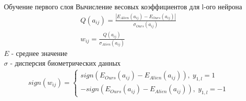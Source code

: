 \begin{frame}{Обучение первого слоя}
    Вычисление весовых коэффициентов для l-ого нейрона
    \begin{gather*}
        Q(a_{ij}) = \frac{|E_{Alien}(a_{ij}) - E_{Ours}(a_{ij})|}{\sigma_{Ours}(a_{ij})} \\
        w_{ij} = \frac{Q(a_{ij})}{\sigma_{Alien}(a_{ij})}
    \end{gather*}
    $E$ - среднее значение \\
    $\sigma$ - дисперсия биометрических данных
    \begin{gather*}
        sign(w_{ij}) = 
        \begin{cases}
            sign(E_{Ours}(a_{ij}) - E_{Alien}(a_{ij})),\; y_{1,l}=1 \\
            -sign(E_{Ours}(a_{ij}) - E_{Alien}(a_{ij})),\; y_{1,l}=-1            
        \end{cases}
    \end{gather*}
\end{frame}